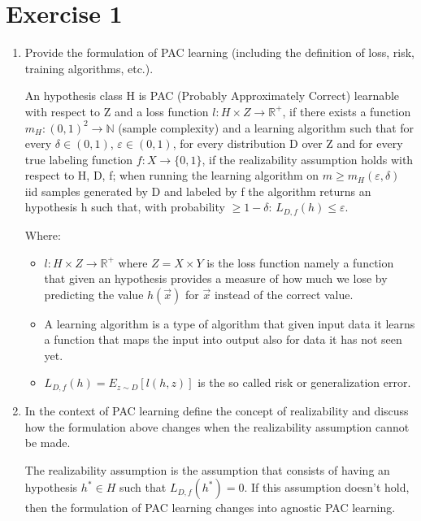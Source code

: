 \documentclass[a4paper,11pt,oneside]{book}
\begin{document}
\section{Exercise 1}
\begin{enumerate}
\item Provide the formulation of PAC learning (including the definition of loss, risk, training algorithms, etc.).
    \begin{solution}        
        An hypothesis class H is PAC (Probably Approximately Correct) learnable with respect 
        to Z and a loss function $l: H\times Z \to \mathbb{R}^+$, if there exists a function $m_H: 
        (0,1)^2 \to \mathbb{N}$ (sample complexity) and a learning algorithm such that for 
        every $\delta \in (0,1)$, $\varepsilon \in (0,1)$, for every distribution D over Z and for 
        every true labeling function $f: X \to \{0,1\}$, if the realizability assumption holds with 
        respect to H, D, f; when running the learning algorithm on $m \geq m_H(\varepsilon, 
        \delta)$ iid samples generated by D and labeled by f the algorithm returns an 
        hypothesis h such that, with probability $\geq 1-\delta$: $L_{D,f}(h) \leq \varepsilon$.
        
        Where:
        \begin{itemize}
        \item $l: H\times Z \to \mathbb{R}^+$ where $Z = X\times Y$ is the loss function namely a 
        function that given an hypothesis provides a measure of how much we lose by 
        predicting the value $h(\vec{x})$ for $\vec{x}$ instead of the correct value.
        
        \item A learning algorithm is a type of algorithm that given input data it learns a function 
        that maps the input into output also for data it has not seen yet.
        
        \item $L_{D,f}(h) = E_{z\sim D}[l(h,z)]$ is the so called risk or generalization error.
        \end{itemize}
    \end{solution}
\clearpage
\item In the context of PAC learning define the concept of realizability and discuss how the formulation above changes when the realizability assumption cannot be made.
    \begin{solution}
        
        The realizability assumption is the assumption that consists of having an hypothesis 
        $h^* \in H$ such that $L_{D,f}(h^*) = 0$. If this assumption doesn't hold, then the 
        formulation of PAC learning changes into agnostic PAC learning.
        

\end{solution}
\end{enumerate}
\end{document}
